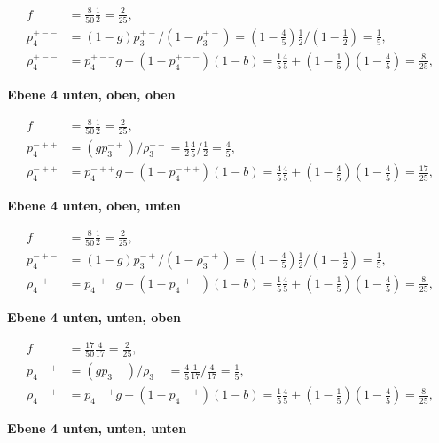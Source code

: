 \documentclass[fleqn]{article}
\begin{document}
\begin{enumerate}[a)]
$$
\begin{aligned}
    f&=\frac{8}{50} \frac{1}{2} = \frac{2}{25} ,\\
    p_{4}^{+--}&=(1-g) p_3^{+-} / (1- \rho_3^{+-}) = \left(1-\frac{4}{5}\right) \frac{1}{2} / \left(1 -\frac{1}{2}\right) = \frac{1}{5}, \\
    \rho_{4}^{+--}&= p_{4}^{+--} g+\left(1-p_{4}^{+--}\right)(1-b) = \frac{1}{5} \frac{4}{5}+\left(1- \frac{1}{5}\right) \left(1- \frac{4}{5}\right)=\frac{8}{25},
\end{aligned}
$$

\textbf{Ebene 4 unten, oben, oben}

$$
\begin{aligned}
    f&=\frac{8}{50} \frac{1}{2} = \frac{2}{25} ,\\
    p_{4}^{-++}&=(g p_3^{-+}) / \rho_3^{-+}= \frac{1}{2} \frac{4}{5} / \frac{1}{2} = \frac{4}{5}, \\
    \rho_{4}^{-++}&= p_{4}^{-++} g+\left(1-p_{4}^{-++}\right)(1-b) = \frac{4}{5} \frac{4}{5}+\left(1- \frac{4}{5}\right) \left(1- \frac{4}{5}\right)=\frac{17}{25},
\end{aligned}
$$

\textbf{Ebene 4 unten, oben, unten}

$$
\begin{aligned}
    f&=\frac{8}{50} \frac{1}{2} = \frac{2}{25} ,\\
    p_{4}^{-+-}&=(1-g) p_3^{-+} / (1- \rho_3^{-+}) = \left(1-\frac{4}{5}\right) \frac{1}{2} / \left(1 -\frac{1}{2}\right) = \frac{1}{5}, \\
    \rho_{4}^{-+-}&= p_{4}^{-+-} g+\left(1-p_{4}^{-+-}\right)(1-b) = \frac{1}{5} \frac{4}{5}+\left(1- \frac{1}{5}\right) \left(1- \frac{4}{5}\right)=\frac{8}{25},
\end{aligned}
$$

\textbf{Ebene 4 unten, unten, oben}

$$
\begin{aligned}
    f&=\frac{17}{50} \frac{4}{17} = \frac{2}{25} ,\\
    p_{4}^{--+}&=\left(g p_3^{--}\right) / \rho_3^{--} = \frac{4}{5} \frac{1}{17} / \frac{4}{17} = \frac{1}{5}, \\
    \rho_{4}^{--+}&= p_{4}^{--+} g+\left(1-p_{4}^{--+}\right)(1-b) = \frac{1}{5} \frac{4}{5}+\left(1- \frac{1}{5}\right) \left(1- \frac{4}{5}\right)=\frac{8}{25},
\end{aligned}
$$

\textbf{Ebene 4 unten, unten, unten}


\end{enumerate}
\end{document}
